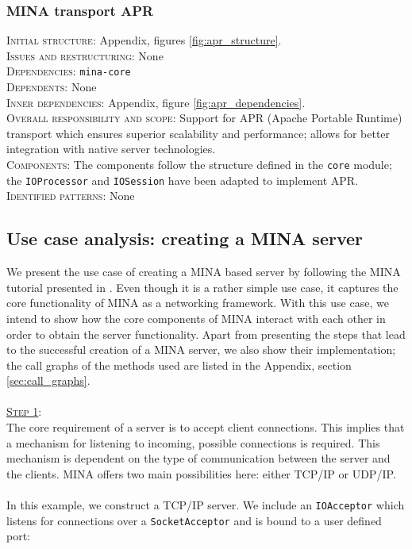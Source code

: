 \subsubsection{MINA transport APR}
\textsc{Initial structure}: Appendix, figures \ref{fig:apr_structure}.  \\
\textsc{Issues and restructuring}: None \\
\textsc{Dependencies}: \texttt{mina-core}\\
\textsc{Dependents}: None\\
\textsc{Inner dependencies}: Appendix, figure \ref{fig:apr_dependencies}. \\
\textsc{Overall responsibility and scope}: Support for APR (Apache Portable Runtime) transport which ensures superior scalability and performance; allows for better integration with native server technologies. \\
\textsc{Components}: The components follow the structure defined in the \texttt{core} module; the \texttt{IOProcessor} and \texttt{IOSession} have been adapted to implement APR. \\
\textsc{Identified patterns}: None \\


\subsection{Use case analysis: creating a MINA server}
We present the use case of creating a MINA based server by following the MINA tutorial presented in \cite{mina-qsguide}. Even though it is a rather simple use case, it captures the core functionality of MINA as a networking framework. With this use case, we intend to show how the core components of MINA interact with each other in order to obtain the server functionality. Apart from presenting the steps that lead to the successful creation of a MINA server, we also show their implementation; the call graphs of the methods used are listed in the Appendix, section \ref{sec:call_graphs}.\\\\
\underline{\textsc{Step 1}}:\\
The core requirement of a server is to accept client connections. This implies that a mechanism for listening to incoming, possible connections is required. This mechanism is dependent on the type of communication between the server and the clients. MINA offers two main possibilities here: either TCP/IP or UDP/IP.\\\\
In this example, we construct a TCP/IP server. We include an \texttt{IOAcceptor} which listens for connections over a \texttt{SocketAcceptor} and is bound to a user defined port:

